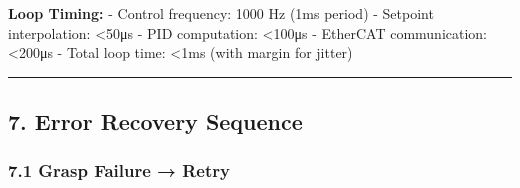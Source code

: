 \documentclass[
]{article}
\begin{document}
\textbf{Loop Timing:} - Control frequency: 1000 Hz (1ms period) -
Setpoint interpolation: \textless50μs - PID computation: \textless100μs
- EtherCAT communication: \textless200μs - Total loop time: \textless1ms
(with margin for jitter)

\begin{center}\rule{0.5\linewidth}{0.5pt}\end{center}

\hypertarget{error-recovery-sequence}{%
\subsection{7. Error Recovery Sequence}\label{error-recovery-sequence}}

\hypertarget{grasp-failure-retry}{%
\subsubsection{7.1 Grasp Failure → Retry}\label{grasp-failure-retry}}
\end{document}
